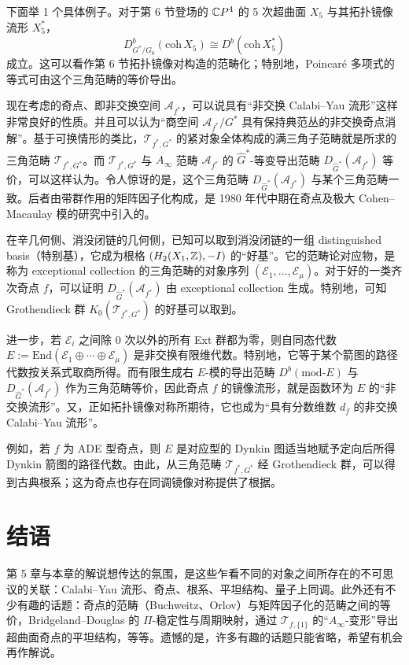 下面举 1 个具体例子。对于第 6 节登场的 $\mathbb{C}P^4$ 的 5 次超曲面 $X_5$ 与其拓扑镜像流形 $X_5^*$，
%
\[
  D^b_{G^*/G_0}(\mathrm{coh}\,X_5)\cong D^b(\mathrm{coh}\,X_5^*)
\]
%
成立。这可以看作第 6 节拓扑镜像对构造的范畴化；特别地，Poincaré 多项式的等式可由这个三角范畴的等价导出。

现在考虑的奇点、即非交换空间 $\mathcal{A}_{f^*}$，可以说具有“非交换 Calabi--Yau 流形”这样非常良好的性质。并且可以认为“商空间 $\mathcal{A}_{f^*}/G^*$ 具有保持典范丛的非交换奇点消解”。基于可换情形的类比，$\mathcal{T}_{f^*,G^*}$ 的紧对象全体构成的满三角子范畴就是所求的三角范畴 $\mathcal{T}_{f^*,G^*}$。而 $\mathcal{T}_{f^*,G^*}$ 与 $A_\infty$ 范畴 $\mathcal{A}_{f^*}$ 的 $\widehat{G}^*$-等变导出范畴 $D_{\widehat{G}^*}(\mathcal{A}_{f^*})$ 等价，可以这样认为。令人惊讶的是，这个三角范畴 $D_{\widehat{G}^*}(\mathcal{A}_{f^*})$ 与某个三角范畴一致。后者由带群作用的矩阵因子化构成，是 1980 年代中期在奇点及极大 Cohen--Macaulay 模的研究中引入的。

在辛几何侧、消没闭链的几何侧，已知可以取到消没闭链的一组 distinguished basis（特别基），它成为根格 $(H_2(X_1,\mathbb{Z}),-I)$ 的“好基”。它的范畴论对应物，是称为 exceptional collection 的三角范畴的对象序列 $(\mathcal{E}_1,\dots,\mathcal{E}_\mu)$。对于好的一类齐次奇点 $f$，可以证明 $D_{\widehat{G}^*}(\mathcal{A}_{f^*})$ 由 exceptional collection 生成。特别地，可知 Grothendieck 群 $K_0(\mathcal{T}_{f^*,G^*})$ 的好基可以取到。

进一步，若 $\mathcal{E}_i$ 之间除 0 次以外的所有 Ext 群都为零，则自同态代数 $E:=\mathrm{End}(\mathcal{E}_1\oplus\cdots\oplus\mathcal{E}_\mu)$ 是非交换有限维代数。特别地，它等于某个箭图的路径代数按关系式取商所得。而有限生成右 $E$-模的导出范畴 $D^b(\mathrm{mod}\text{-}E)$ 与 $D_{\widehat{G}^*}(\mathcal{A}_{f^*})$ 作为三角范畴等价，因此奇点 $f$ 的镜像流形，就是函数环为 $E$ 的“非交换流形”。又，正如拓扑镜像对称所期待，它也成为“具有分数维数 $d_f$ 的非交换 Calabi--Yau 流形”。

例如，若 $f$ 为 ADE 型奇点，则 $E$ 是对应型的 Dynkin 图适当地赋予定向后所得 Dynkin 箭图的路径代数。由此，从三角范畴 $\mathcal{T}_{f^*,G^*}$ 经 Grothendieck 群，可以得到古典根系；这为奇点也存在同调镜像对称提供了根据。

\section{结语}

第 5 章与本章的解说想传达的氛围，是这些乍看不同的对象之间所存在的不可思议的关联：Calabi--Yau 流形、奇点、根系、平坦结构、量子上同调。此外还有不少有趣的话题：奇点的范畴（Buchweitz、Orlov）与矩阵因子化的范畴之间的等价，Bridgeland--Douglas 的 $\Pi$-稳定性与周期映射，通过 $\mathcal{T}_{f,\{1\}}$ 的“$A_\infty$-变形”导出超曲面奇点的平坦结构，等等。遗憾的是，许多有趣的话题只能省略，希望有机会再作解说。

\renewcommand{\thesection}{\Roman{section}}
